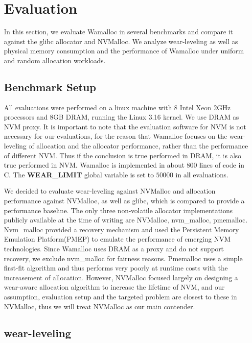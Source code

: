 \documentclass{vldb}
\begin{document}
\section{Evaluation}

In this section, we evaluate Wamalloc in several benchmarks and compare it against the glibc allocator and NVMalloc\cite{moraru2013consistent}.
We analyze wear-leveling as well as physical memory consumption and the performance of Wamalloc under uniform and random allocation workloads.

\subsection{Benchmark Setup}

All evaluations were performed on a linux machine with 8 Intel Xeon 2GHz processors and 8GB DRAM, running the Linux 3.16 kernel.
We use DRAM as NVM proxy. It is important to note that the evaluation software for NVM is not necessary for our evaluations, for the reason that Wamalloc focuses on the wear-leveling of allocation and the allocator performance, rather than the performance of different NVM.
Thus if the conclusion is true performed in DRAM, it is also true performed in NVM.
Wamalloc is implemented in about 800 lines of code in C.
The \textbf{WEAR\_LIMIT} global variable is set to $50000$ in all evaluations.

We decided to evaluate wear-leveling against NVMalloc and allocation performance against NVMalloc, as well as glibc,
which is compared to provide a performance baseline. 
The only three non-volatile allocator implementations publicly available at the time of writing are NVMalloc, nvm\_malloc\cite{schwalbnvm}, pmemalloc.
Nvm\_malloc provided a recovery mechanism and used the Persistent Memory Emulation Platform(PMEP)\cite{dulloor2014system} to emulate the performance of emerging NVM technologies.
Since Wamalloc uses DRAM as a proxy and do not support recovery, we exclude nvm\_malloc for fairness reasons.
Pmemalloc uses a simple first-fit algorithm and thus performs very poorly at runtime costs with the increasement of allocation.
However, NVMalloc focused largely on designing a wear-aware allocation algorithm to increase the lifetime of NVM, 
and our assumption, evaluation setup and the targeted problem are closest to these in NVMalloc, 
thus we will treat NVMalloc as our main contender.

\subsection{wear-leveling}
\end{document}
